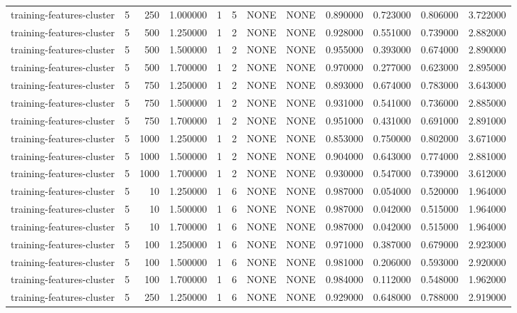 \begin{tabular}{lrrrllllrrrr}
training-features-cluster & 5 & 250 & 1.000000 & 1 & 5 & NONE & NONE & 0.890000 & 0.723000 & 0.806000 & 3.722000 \\
training-features-cluster & 5 & 500 & 1.250000 & 1 & 2 & NONE & NONE & 0.928000 & 0.551000 & 0.739000 & 2.882000 \\
training-features-cluster & 5 & 500 & 1.500000 & 1 & 2 & NONE & NONE & 0.955000 & 0.393000 & 0.674000 & 2.890000 \\
training-features-cluster & 5 & 500 & 1.700000 & 1 & 2 & NONE & NONE & 0.970000 & 0.277000 & 0.623000 & 2.895000 \\
training-features-cluster & 5 & 750 & 1.250000 & 1 & 2 & NONE & NONE & 0.893000 & 0.674000 & 0.783000 & 3.643000 \\
training-features-cluster & 5 & 750 & 1.500000 & 1 & 2 & NONE & NONE & 0.931000 & 0.541000 & 0.736000 & 2.885000 \\
training-features-cluster & 5 & 750 & 1.700000 & 1 & 2 & NONE & NONE & 0.951000 & 0.431000 & 0.691000 & 2.891000 \\
training-features-cluster & 5 & 1000 & 1.250000 & 1 & 2 & NONE & NONE & 0.853000 & 0.750000 & 0.802000 & 3.671000 \\
training-features-cluster & 5 & 1000 & 1.500000 & 1 & 2 & NONE & NONE & 0.904000 & 0.643000 & 0.774000 & 2.881000 \\
training-features-cluster & 5 & 1000 & 1.700000 & 1 & 2 & NONE & NONE & 0.930000 & 0.547000 & 0.739000 & 3.612000 \\
training-features-cluster & 5 & 10 & 1.250000 & 1 & 6 & NONE & NONE & 0.987000 & 0.054000 & 0.520000 & 1.964000 \\
training-features-cluster & 5 & 10 & 1.500000 & 1 & 6 & NONE & NONE & 0.987000 & 0.042000 & 0.515000 & 1.964000 \\
training-features-cluster & 5 & 10 & 1.700000 & 1 & 6 & NONE & NONE & 0.987000 & 0.042000 & 0.515000 & 1.964000 \\
training-features-cluster & 5 & 100 & 1.250000 & 1 & 6 & NONE & NONE & 0.971000 & 0.387000 & 0.679000 & 2.923000 \\
training-features-cluster & 5 & 100 & 1.500000 & 1 & 6 & NONE & NONE & 0.981000 & 0.206000 & 0.593000 & 2.920000 \\
training-features-cluster & 5 & 100 & 1.700000 & 1 & 6 & NONE & NONE & 0.984000 & 0.112000 & 0.548000 & 1.962000 \\
training-features-cluster & 5 & 250 & 1.250000 & 1 & 6 & NONE & NONE & 0.929000 & 0.648000 & 0.788000 & 2.919000 \\

\end{tabular}
